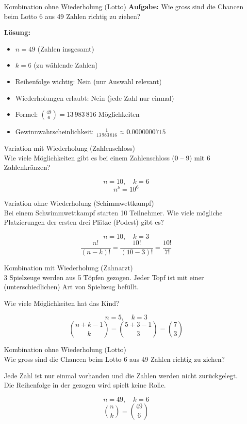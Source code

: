 \begin{example2}{Kombination ohne Wiederholung (Lotto)}
\textbf{Aufgabe:} Wie gross sind die Chancen beim Lotto 6 aus 49 Zahlen richtig zu ziehen?

\textbf{Lösung:}
\begin{itemize}
\item $n = 49$ (Zahlen insgesamt)
\item $k = 6$ (zu wählende Zahlen)
\item Reihenfolge wichtig: Nein (nur Auswahl relevant)
\item Wiederholungen erlaubt: Nein (jede Zahl nur einmal)
\item Formel: $\binom{49}{6} = 13\,983\,816$ Möglichkeiten
\item Gewinnwahrscheinlichkeit: $\frac{1}{13\,983\,816} \approx 0.0000000715$
\end{itemize}
\end{example2}

\begin{example2}{Variation mit Wiederholung (Zahlenschloss)}\\
Wie viele Möglichkeiten gibt es bei einem Zahlenschloss (0 -- 9) mit 6 Zahlenkränzen?

$$n = 10, \quad k = 6$$
$$n^k = 10^6$$
\end{example2}

\begin{example2}{Variation ohne Wiederholung (Schimmwettkampf)}\\
Bei einem Schwimmwettkampf starten 10 Teilnehmer. Wie viele mögliche Platzierungen der ersten drei Plätze (Podest) gibt es?

$$n = 10, \quad k = 3$$
$$\frac{n!}{(n-k)!} = \frac{10!}{(10-3)!} = \frac{10!}{7!}$$
\end{example2}

\begin{example2}{Kombination mit Wiederholung (Zahnarzt)}\\
3 Spielzeuge werden aus 5 Töpfen gezogen. Jeder Topf ist mit einer (unterschiedlichen) Art von Spielzeug befüllt.

Wie viele Möglichkeiten hat das Kind?

$$n = 5, \quad k = 3$$
$$\binom{n+k-1}{k} = \binom{5+3-1}{3} = \binom{7}{3}$$
\end{example2}

\begin{example2}{Kombination ohne Wiederholung (Lotto)}\\
Wie gross sind die Chancen beim Lotto 6 aus 49 Zahlen richtig zu ziehen?

Jede Zahl ist nur einmal vorhanden und die Zahlen werden nicht zurückgelegt. Die Reihenfolge in der gezogen wird spielt keine Rolle.

$$n = 49, \quad k = 6$$
$$\binom{n}{k} = \binom{49}{6}$$
\end{example2}


